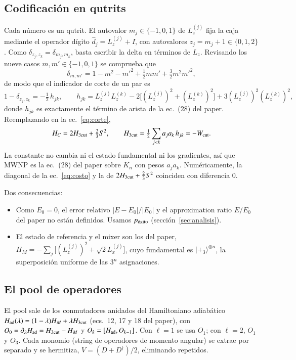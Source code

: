 \documentclass[11pt,a4paper]{article}
\newcommand{\pex}{p_{\rm \acute{e}xito}}
\renewcommand{\ket}[1]{|#1\rangle}
\begin{document}
\subsection{Codificación en qutrits}

Cada número es un qutrit. El autovalor $m_j\in\{-1,0,1\}$ de $L_z^{(j)}$ fija la caja mediante el
operador dígito $\hat d_j=L_z^{(j)}+I$, con autovalores $z_j=m_j+1\in\{0,1,2\}$. Como
$\delta_{z_j,z_k}=\delta_{m_j,m_k}$, basta escribir la delta en términos de $L_z$. Revisando los
nueve casos $m,m'\in\{-1,0,1\}$ se comprueba que
\begin{equation}
  \delta_{m,m'}=1-m^2-m'^2+\tfrac12mm'+\tfrac32m^2m'^2 ,
\end{equation}
de modo que el indicador de corte de un par es
\begin{equation}
  1-\delta_{z_j,z_k}=-\tfrac12\,h_{jk},\qquad
  h_{jk}=L_z^{(j)}L_z^{(k)}-2\big[(L_z^{(j)})^2+(L_z^{(k)})^2\big]+3(L_z^{(j)})^2(L_z^{(k)})^2 ,
\end{equation}
donde $h_{jk}$ es exactamente el término de arista de la ec.~(28) del paper. Reemplazando en la
ec.~\eqref{eq:corte},
\begin{equation}
  H_C=2H_{\rm 3cut}+\tfrac23S^2,\qquad
  H_{\rm 3cut}=\tfrac12\sum_{j<k}a_ja_k\,h_{jk}=-W_{\rm cut}.
  \label{eq:HC}
\end{equation}
La constante no cambia ni el estado fundamental ni los gradientes, así que MWNP es la ec.~(28)
del paper sobre $K_n$ con pesos $a_ja_k$. Numéricamente, la diagonal de la ec.~\eqref{eq:costo}
y la de $2H_{\rm 3cut}+\frac23S^2$ coinciden con diferencia $0$.

Dos consecuencias:
\begin{itemize}
\item Como $E_0=0$, el error relativo $|E-E_0|/|E_0|$ y el approximation ratio $E/E_0$ del paper
  no están definidos. Usamos $\pex$ (sección~\ref{sec:analisis}).
\item El estado de referencia y el mixer son los del paper,
  $H_M=-\sum_j\big[(L_z^{(j)})^2+\sqrt2L_x^{(j)}\big]$, cuyo fundamental es
  $\ket{+_3}^{\otimes n}$, la superposición uniforme de las $3^n$ asignaciones.
\end{itemize}

\subsection{El pool de operadores}
\label{sec:pool}

El pool sale de los conmutadores anidados del Hamiltoniano adiabático
$H_{\rm ad}(\lambda)=(1-\lambda)H_M+\lambda H_{\rm 3cut}$ (ecs.~12, 17 y 18 del paper), con
$O_0=\partial_\lambda H_{\rm ad}=H_{\rm 3cut}-H_M$ y $O_k=[H_{\rm ad},O_{k-1}]$. Con $\ell=1$ se usa
$O_1$; con $\ell=2$, $O_1$ y $O_3$. Cada monomio (string de operadores de momento angular) se
extrae por separado y se hermitiza, $V=(D+D^\dagger)/2$, eliminando repetidos.
\end{document}
